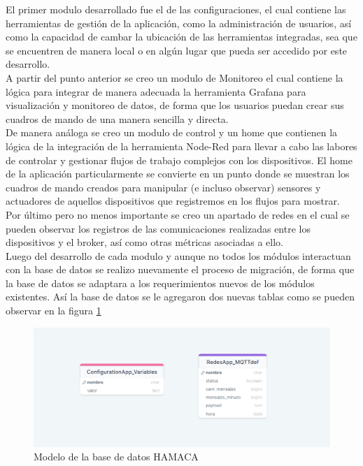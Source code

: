 El primer modulo desarrollado fue el de las configuraciones, el cual contiene las herramientas de gestión de la aplicación, como la administración de usuarios, así como la capacidad de cambar la ubicación de las herramientas integradas, sea que se encuentren de manera local o en algún lugar que pueda ser accedido por este desarrollo.\\ 

A partir del punto anterior se creo un modulo de Monitoreo el cual contiene la lógica para integrar de manera adecuada la herramienta Grafana para visualización y monitoreo de datos, de forma que los usuarios puedan crear sus cuadros de mando de una manera sencilla y directa.\\

De manera análoga se creo un modulo de control y un home que contienen la lógica de la integración de la herramienta Node-Red para llevar a cabo las labores de controlar y gestionar flujos de trabajo complejos con los dispositivos. El home de la aplicación particularmente se convierte en un punto donde se muestran los cuadros de mando creados para manipular (e incluso observar) sensores y actuadores de aquellos dispositivos que registremos en los flujos para mostrar.\\

Por último pero no menos importante se creo un apartado de redes en el cual se pueden observar los registros de las comunicaciones realizadas entre los dispositivos y el broker, así como otras métricas asociadas a ello.\\

Luego del desarrollo de cada modulo y aunque no todos los módulos interactuan con la base de datos se realizo nuevamente el proceso de migración, de forma que la base de datos se adaptara a los requerimientos nuevos de los módulos existentes. Así la base de datos se le agregaron dos nuevas tablas como se pueden observar en la figura \ref{fig:psql_hamaca_db}
\begin{figure}[!htb]
\centering
\includegraphics[scale=0.25]{./Figuras/psql_hamaca_db.png}
\caption{Modelo de la base de datos HAMACA}
\label{fig:psql_hamaca_db}
\vspace*{-10pt}
\end{figure}
